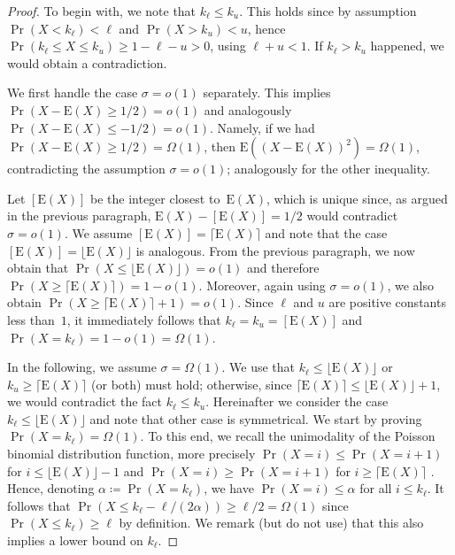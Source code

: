 \documentclass[11pt, a4paper]{article}
\DeclareMathOperator{\Prob}{Pr}
\newcommand*{\E}{\mathrm{E}}
\begin{document}
\begin{proof}
To begin with, we note that $k_\ell\le k_u$.  This holds since by assumption $\Prob(X<k_\ell)<\ell$ 
and $\Prob(X>k_u)<u$, hence $\Prob(k_\ell \le X \le k_u)\ge 1-\ell-u > 0$, using $\ell+u<1$. If $k_\ell>k_u$
happened, 
we would obtain a contradiction.


We first handle the case $\sigma=o(1)$ separately. This implies $\Prob(X-\E(X)\ge 1/2)=o(1)$ and analogously 
$\Prob(X-\E(X)\le -1/2)=o(1)$. Namely, if we had 
$\Prob(X-\E(X)\ge 1/2)=\Omega(1)$, then $\E((X-\E(X))^2)=\Omega(1)$, contradicting the assumption $\sigma=o(1)$; 
analogously for the other inequality.
 
Let $[\E(X)]$ be the integer closest to~$\E(X)$, which is unique since, as argued in the previous paragraph, 
$\E(X)-[\E(X)] = 1/2$ would contradict 
$\sigma=o(1)$. We assume 
$[\E(X)]=\lceil \E(X)\rceil$ and note that the case $[\E(X)]=\lfloor \E(X)\rfloor$ is analogous. 
From the previous paragraph, we now obtain that 
 $\Prob(X\le \lfloor\E(X)\rfloor)=o(1)$ and therefore $\Prob(X\ge \lceil\E(X)\rceil)=1-o(1)$. Moreover, 
again using $\sigma=o(1)$, we also obtain $\Prob(X\ge \lceil\E(X)\rceil+1)=o(1)$.
Since $\ell$ and 
$u$ are positive constants less than~$1$, 
it immediately follows that $k_\ell=k_u=[\E(X)]$ and $\Prob(X=k_\ell)=1-o(1)=\Omega(1)$. 

%
%



 

In the following, we assume $\sigma=\Omega(1)$. We use that 
$k_\ell\le \lfloor\E(X)\rfloor$ or $k_u\ge \lceil\E(X)\rceil$ (or both) 
must hold; otherwise, since $\lceil\E(X)\rceil\le \lfloor\E(X)\rfloor+1$, we 
would contradict the fact $k_\ell\le k_u$. 
Hereinafter we consider the case $k_\ell\le \lfloor\E(X)\rfloor$ and note that other case is symmetrical.
 We start by proving 
$\Prob(X=k_\ell)=\Omega(1)$. To this end, we recall 
the unimodality of the Poisson binomial distribution function, more precisely 
$\Prob(X=i)\le \Prob(X=i+1)$ for $i\le \lfloor\E(X)\rfloor-1$ and $\Prob(X=i)\ge \Prob(X=i+1)$ for 
$i\ge \lceil\E(X)\rceil$ \cite{Samuels1965}. Hence, 
 denoting  $\alpha\coloneqq \Prob(X=k_\ell)$, we have 
$\Prob(X=i)\le \alpha$ for all $i\le k_\ell$. It follows  
 that $\Prob(X\le k_\ell-\ell/(2\alpha))\ge \ell/2=\Omega(1)$ 
since $\Prob(X\le k_\ell)\ge \ell$ by definition. We remark (but do not use) that this also implies 
a lower bound on $k_\ell$. 


\end{proof}
\end{document}
